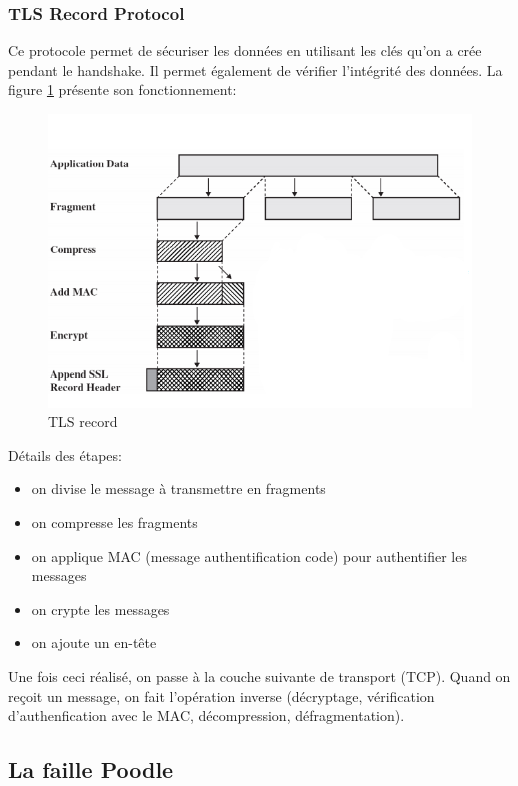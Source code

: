 \subsubsection{TLS Record Protocol}

Ce protocole permet de sécuriser les données en utilisant les clés qu'on a crée pendant le handshake. Il permet également de vérifier l'intégrité des données. La figure \ref{record} présente son fonctionnement:
\begin{figure}[H]
\centering
\includegraphics[scale=0.7]{img/tls-record.png}
\caption{TLS record}
\label{record}
\end{figure}

Détails des étapes:
\begin{itemize}
\item on divise le message à transmettre en fragments 
\item on compresse les fragments
\item on applique MAC (message authentification code) pour authentifier les messages 
\item on crypte les messages
\item on ajoute un en-t\^ete
\end{itemize}
Une fois ceci réalisé, on passe à la couche suivante de transport (TCP). Quand on reçoit un message, on fait l'opération inverse (décryptage, vérification d'authenfication avec le MAC, décompression, défragmentation).


\subsection{La faille Poodle}

